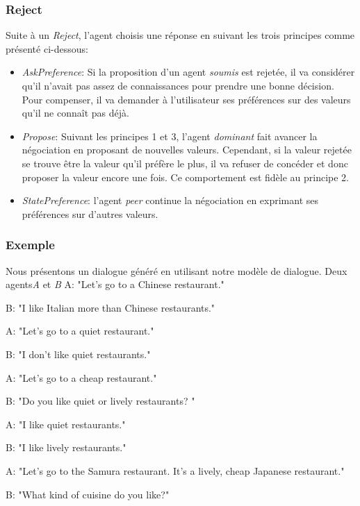 		\subsubsection{Reject}
			Suite à un \emph{Reject}, l'agent choisis une réponse en suivant les trois principes comme présenté ci-dessous:
			\begin{itemize}
				\item \emph{AskPreference}: Si la proposition d'un agent \emph{soumis} est rejetée, il va considérer qu'il n'avait pas assez de connaissances pour prendre une bonne décision. Pour compenser, il va demander à l'utilisateur ses préférences sur des valeurs qu'il ne connaît pas déjà. 
				
				\item \emph{Propose}: Suivant les principes 1 et 3, l'agent \emph{dominant} fait avancer la négociation en proposant de nouvelles valeurs. Cependant, si la valeur rejetée se trouve être la valeur qu'il préfère le plus, il va refuser de concéder et donc proposer la valeur encore une fois. Ce comportement est fidèle au principe 2. 
				
				\item \emph{StatePreference}: l'agent \emph{peer} continue la négociation en exprimant ses préférences sur d'autres valeurs. 
			\end{itemize}	
			
	\subsubsection{Exemple}
		Nous présentons un dialogue généré en utilisant notre modèle de dialogue. Deux agents\textit{A} et \textit{B}
		A: "Let's go to a Chinese restaurant."
		
		B: "I like Italian more than Chinese restaurants."
		
		A: "Let's go to a quiet restaurant."
		
		B: "I don't like quiet restaurants."
		
		A: "Let's go to a cheap restaurant."
		
		B: "Do you like quiet or lively restaurants? "
		
		A: "I like quiet restaurants."
		
		B: "I like lively restaurants."
		
		A: "Let's go to the Samura restaurant. It's a lively, cheap Japanese restaurant."
		
		B: "What kind of cuisine do you like?"
		
